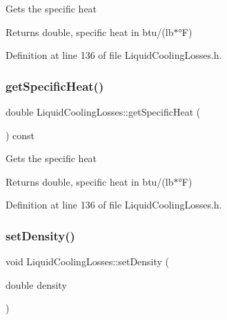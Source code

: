 Gets the specific heat

\begin{DoxyReturn}{Returns}
double, specific heat in btu/(lb$\ast$°F) 
\end{DoxyReturn}


Definition at line 136 of file Liquid\+Cooling\+Losses.\+h.

\mbox{\label{class_liquid_cooling_losses_aa60623b6f1fab605d25c9c24e8dd00ec}} 
\subsubsection{\texorpdfstring{get\+Specific\+Heat()}{getSpecificHeat()}\hspace{0.1cm}{\footnotesize\ttfamily [3/3]}}
{\footnotesize\ttfamily double Liquid\+Cooling\+Losses\+::get\+Specific\+Heat (\begin{DoxyParamCaption}{ }\end{DoxyParamCaption}) const\hspace{0.3cm}{\ttfamily [inline]}}

Gets the specific heat

\begin{DoxyReturn}{Returns}
double, specific heat in btu/(lb$\ast$°F) 
\end{DoxyReturn}


Definition at line 136 of file Liquid\+Cooling\+Losses.\+h.

\mbox{\label{class_liquid_cooling_losses_a1fcb1780b588e0a6e5ca052ce2b360dc}} 
\subsubsection{\texorpdfstring{set\+Density()}{setDensity()}\hspace{0.1cm}{\footnotesize\ttfamily [1/3]}}
{\footnotesize\ttfamily void Liquid\+Cooling\+Losses\+::set\+Density (\begin{DoxyParamCaption}\item[{double}]{density }\end{DoxyParamCaption})\hspace{0.3cm}{\ttfamily [inline]}}

